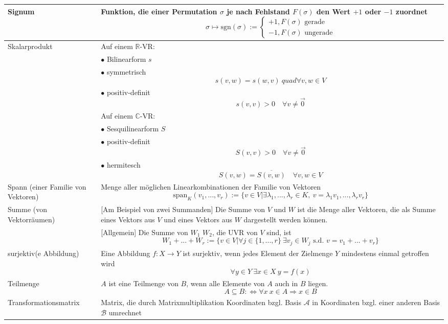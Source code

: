 \documentclass{article}
\begin{document}
\begin{xltabular}{\linewidth}{p{0.33\textwidth}|X}
	\hline
		Signum & Funktion, die einer Permutation $\sigma$ je nach Fehlstand $F(\sigma)$ den Wert $+1$ oder $-1$ zuordnet
			$$\sigma \mapsto \text{sgn}(\sigma) :=
			\begin{cases}
				+1, \text{$F(\sigma)$ gerade}\\
				-1, \text{$F(\sigma)$ ungerade}
			\end{cases}$$ \\
	\hline
		Skalarprodukt & Auf einem $\mathbb{R}$-VR: \\
			& $\bullet$ Bilinearform $s$ \\
			& $\bullet$ symmetrisch
				$$s(v,w) = s(w,v)\	quad \forall v,w\in V$$ \\
			& $\bullet$ positiv-definit
				$$s(v,v) > 0\quad \forall v\neq \vec{0}$$ \\
			& Auf einem $\mathbb{C}$-VR: \\
			& $\bullet$ Sesquilinearform $S$ \\
			& $\bullet$ positiv-definit
				$$S(v,v)>0\quad \forall v\neq \vec{0}$$ \\
			& $\bullet$ hermitesch
				$$S(v,w) = \overline{S(v,w)}\quad \forall v,w\in V$$ \\
	\hline
		Spann (einer Familie von Vektoren) & Menge aller möglichen Linearkombinationen der Familie von Vektoren
			$$\text{span}_K(v_1,...,v_r) := \{v\in V | \exists \lambda_1,...,\lambda_r \in K,\ v = \lambda_1 v_1,..., \lambda_r v_r\}$$ \\
	\hline
		Summe (von Vektorräumen) & \textcolor{gruen}{[Am Beispiel von zwei Summanden]} Die Summe von $V$ und $W$ ist die Menge aller Vektoren, die als Summe eines Vektors aus $V$ und eines Vektors aus $W$ dargestellt werden können.\\
		& \textcolor{gruen}{[Allgemein]} Die Summe von $W_1$ $W_2$, die UVR von $V$ sind, ist
			$$W_1 + ... + W_r := \{v\in V | \forall j\in\{1,...,r\}\ \exists v_j\in W_j \text{ s.d. } v = v_1 + ... + v_r\}$$ \\
	\hline
		surjektiv(e Abbildung) & Eine Abbildung $f:X\rightarrow Y$ ist surjektiv, wenn jedes Element der Zielmenge $Y$ mindestens einmal getroffen wird 
			$$\forall y\in Y\ \exists x\in X\ y=f(x)$$ \\
	\hline
		Teilmenge & $A$ ist eine Teilmenge von $B$, wenn alle Elemente von $A$ auch in $B$ liegen.
			$$A\subseteq B :\Leftrightarrow \forall x\ x\in A \Rightarrow x\in B$$ \\
	\hline
		Transformationsmatrix & Matrix, die durch Matrixmultiplikation Koordinaten bzgl. Basis $\mathcal{A}$ in Koordinaten bzgl. einer anderen Basis $\mathcal{B}$ umrechnet\\

\end{xltabular}
\end{document}

